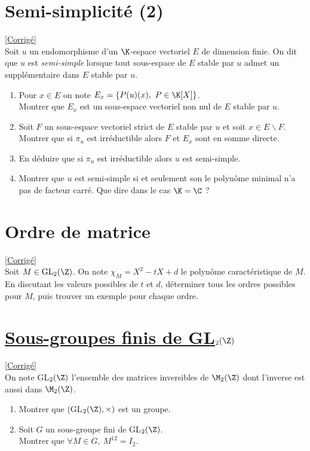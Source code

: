 \documentclass[8pt]{book}
\begin{document}
	\section{Semi-simplicité (2) }
	\label{Semi-simplicité (2)}
	\textcolor{blue}{\hyperref[Semi-simplicité (2) corrigé]{[Corrigé]}}\\
	Soit $u$ un endomorphisme d'un $\K$-espace vectoriel $E$ de dimension finie. On dit que $u$ est \textit{semi-simple} lorsque tout sous-espace de $E$ stable par $u$ admet un supplémentaire dans $E$ stable par $u$.
	\begin{enumerate}
		\item Pour $x\in E$ on note $E_x=\{P(u)(x),\ P\in \K[X]\}$.\\
		Montrer que $E_x$ est un sous-espace vectoriel non nul de $E$ stable par $u$.
		\item Soit $F$ un sous-espace vectoriel strict de $E$ stable par $u$ et soit $x\in E\backslash F$.\\
		Montrer que si $\pi_u$ est irréductible alors $F$ et $E_x$ sont en somme directe.
		\item En déduire que si $\pi_u$ est irréductible alors $u$ est semi-simple.
		\item Montrer que $u$ est semi-simple si et seulement son le polynôme minimal n'a pas de facteur carré. Que dire dans le cas $\K=\C$ ?
	\end{enumerate}
	
	\section{Ordre de matrice }
	\label{Ordre de matrice}
	\textcolor{blue}{\hyperref[Ordre de matrice corrigé]{[Corrigé]}}\\
	Soit $M\in \text{GL}_2(\Z)$. On note $\chi_M=X^2-tX+d$ le polynôme caractéristique de $M$.
	\\ En discutant les valeurs possibles de $t$ et $d$, déterminer tous les ordres possibles pour $M$, puis trouver un exemple pour chaque ordre.
	
	\section{\underline{Sous-groupes finis de GL$_2(\Z)$} }
	\label{Sous-groupes finis de GL2(Z)}
	\textcolor{blue}{\hyperref[Sous-groupes finis de GL2(Z) corrigé]{[Corrigé]}}\\
	On note GL$_2(\Z)$ l'ensemble des matrices inversibles de $\M_2(\Z)$ dont l'inverse est aussi dans $\M_2(\Z)$.
	\begin{enumerate}
		\item Montrer que (GL$_2(\Z),\times)$ est un groupe.
		\item Soit $G$ un sous-groupe fini de GL$_2(\Z)$.\\
		Montrer que $\forall M\in G,\ M^{12}=I_2$.
	\end{enumerate}
	
\end{document}
